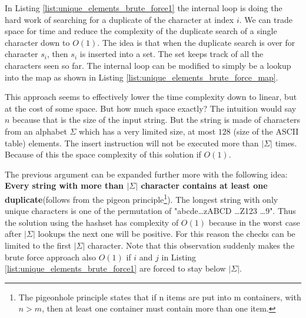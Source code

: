 	


In Listing \ref{list:unique_elements_brute_force1} the internal loop is doing the hard work of searching for a duplicate of the character at index $i$. We can trade space for time and reduce the complexity of the duplicate search of a single character down to $O(1)$. The idea is that when the duplicate search is over for character $s_i$, then $s_i$ is inserted into a set. The set keeps track of all the characters seen so far. The internal loop can be modified to simply be a lookup into the map as shown in Listing \ref{list:unique_elements_brute_force_map}.


	


This approach seems to effectively lower the time complexity down to linear, but at the cost of some space. But how much space exactly? The intuition would say $n$ because that is the size of the  input string. But the string is made of characters from an alphabet $\Sigma$ which has a very limited size, at most $128$ (size of the ASCII table) elements. The insert instruction will not be executed more than $|\Sigma|$ times. Because of this the space complexity of this solution if $O(1)$. 

The previous argument can be expanded further more with the following idea: \textbf{Every string with more than $|\Sigma|$ character contains at least one duplicate}(follows from the pigeon principle\footnote{The pigeonhole principle states that if n items are put into m containers, with $n > m$, then at least one container must contain more than one item.}). The longest string with only unique characters is one of the permutation of "abcde\ldots zABCD \ldots Z123 \ldots 9".
Thus the solution using the hashset has complexity of $O(1)$ because in the worst case after $|\Sigma|$ lookups the next one will be positive. For this reason the checks can be limited to the first $|\Sigma|$ character. Note that this observation suddenly makes the brute force approach also $O(1)$ if $i$ and $j$ in Listing \ref{list:unique_elements_brute_force1} are forced to stay below $|\Sigma|$.

